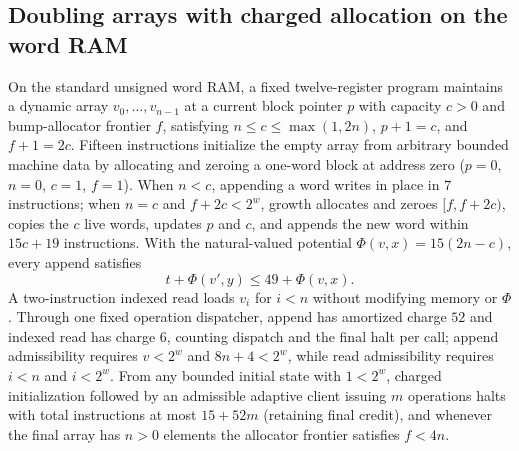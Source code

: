 \begin{result}
\subsection{Doubling arrays with charged allocation on the word RAM}
On the standard unsigned word RAM, a fixed twelve-register program maintains a dynamic array
$v_0,\ldots,v_{n-1}$ at a current block pointer $p$ with capacity $c>0$ and bump-allocator
frontier $f$, satisfying $n\le c\le\max(1,2n)$, $p+1=c$, and $f+1=2c$. Fifteen instructions
initialize the empty array from arbitrary bounded machine data by allocating and zeroing a
one-word block at address zero ($p=0$, $n=0$, $c=1$, $f=1$). When $n<c$, appending a word writes
in place in $7$ instructions; when $n=c$ and $f+2c<2^w$, growth allocates and zeroes $[f,f+2c)$,
copies the $c$ live words, updates $p$ and $c$, and appends the new word within $15c+19$
instructions. With the natural-valued potential $\Phi(v,x)=15(2n-c)$, every append satisfies
\[
  t+\Phi(v',y)\le 49+\Phi(v,x).
\]
A two-instruction indexed read loads $v_i$ for $i<n$ without modifying memory or $\Phi$. Through
one fixed operation dispatcher, append has amortized charge $52$ and indexed read has charge $6$,
counting dispatch and the final halt per call; append admissibility requires $v<2^w$ and
$8n+4<2^w$, while read admissibility requires $i<n$ and $i<2^w$. From any bounded initial state
with $1<2^w$, charged initialization followed by an admissible adaptive client issuing $m$
operations halts with total instructions at most $15+52m$ (retaining final credit), and whenever
the final array has $n>0$ elements the allocator frontier satisfies $f<4n$.


\end{result}
